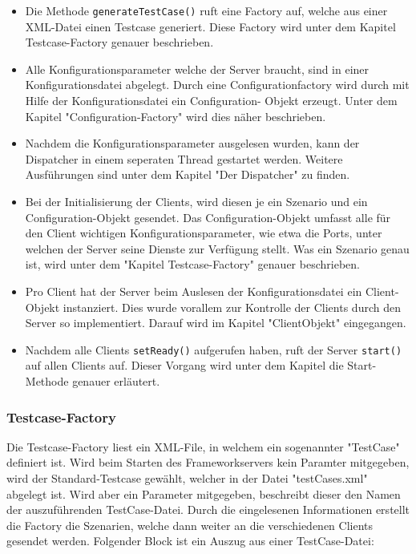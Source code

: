 \begin{itemize}
\item Die Methode \texttt{generateTestCase()} ruft eine Factory auf, welche aus einer XML-Datei einen Testcase generiert. Diese Factory wird unter dem Ka\-pi\-tel Testcase-Factory genauer be\-schrie\-ben.
\item Alle Konfigurationsparameter welche der Server braucht, sind in einer Konfigurations\-datei ab\-ge\-legt. Durch eine Configurationfactory wird durch mit Hilfe der Konfig\-urationsdatei ein Configuration- Objekt er\-zeugt. Unter dem Kapi\-tel "Configuration-Factory" wird dies näher beschrieben.
\item Nachdem die Konfigurationsparameter ausgelesen wurden, kann der Dis\-patcher in einem seper\-aten Thread ge\-startet werden. Weitere Aus\-füh\-run\-gen sind unter dem Kapitel "Der Dispatcher" zu finden.
\item Bei der Initialisierung der Clients, wird diesen je ein Szenario und ein Configuration-Objekt gesendet. Das Configuration-Objekt umfasst alle für den Client wichtigen Konfigurationsparameter, wie etwa die Ports, unter welchen der Server seine Dienste zur Verfügung stellt. Was ein Szenario genau ist, wird unter dem "Kapitel Testcase-Factory" genauer beschrieben.
\item Pro Client hat der Server beim Auslesen der Konfigurationsdatei ein Client-Objekt instanziert. Dies wurde voral\-lem zur Kon\-trol\-le der Cli\-ents durch den Server so implementiert. Darauf wird im Kapitel "ClientObjekt" eingegangen.
\item Nachdem alle Clients \texttt{setReady()} aufgerufen haben, ruft der Server \texttt{start()} auf allen Clients auf. Dieser Vorgang wird unter dem Kapitel die Start-Methode genauer erläutert.
\end{itemize}

\subsubsection{Testcase-Factory}
\label{sec:testCaseFactory}
Die Testcase-Factory liest ein XML-File, in welchem ein sogenannter "TestCase" definiert ist. Wird beim Starten des Frameworkservers kein Paramter mitgegeben, wird der Standard-Testcase gewählt, welcher in der Datei "testCases.xml" abgelegt ist. Wird aber ein Parameter mitgegeben, beschreibt dieser den Namen der auszuführenden TestCase-Datei.\newline
Durch die ein\-ge\-lesenen In\-for\-ma\-tio\-nen er\-stellt die Fac\-tory die Szena\-rien, wel\-che dann wei\-ter an die ver\-schie\-denen Clients ge\-sendet werden. Folgender Block ist ein Auszug aus einer TestCase-Datei:


